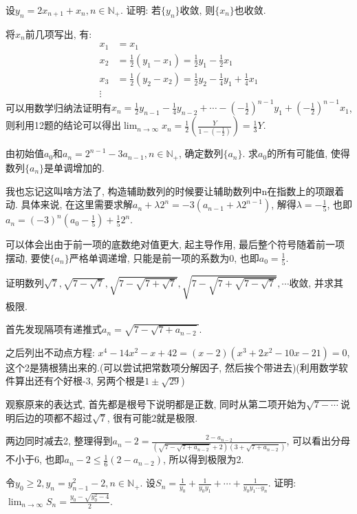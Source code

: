     \begin{exercise}
         设$y_n=2x_{n+1}+x_n, n\in \mathbb{N}_+$. 证明: 若$\{y_n\}$收敛, 则$\{x_n\}$也收敛.
     \end{exercise}
     \begin{solution}
         将$x_n$前几项写出, 有:
         \begin{align*}
             x_1 & =x_1                                                               \\
             x_2 & =\frac{1}{2}(y_1-x_1)=\frac{1}{2}y_1-\frac{1}{2}x_1                \\
             x_3 & =\frac{1}{2}(y_2-x_2)=\frac{1}{2}y_2-\frac{1}{4}y_1+\frac{1}{4}x_1 \\
             \vdots
         \end{align*}
         可以用数学归纳法证明有$x_n=\frac{1}{2}y_{n-1}-\frac{1}{4}y_{n-2}+\cdots-(-\frac{1}{2})^{n-1}y_1+(-\frac{1}{2})^{n-1}x_1$,则利用12题的结论可以得出$\lim_{n\to\infty}x_n=\frac{1}{2}(\frac{Y}{1-(-\frac{1}{2})})=\frac{1}{3}Y$.
     \end{solution}

     \begin{exercise}
         由初始值$a_0$和$a_n=2^{n-1}-3a_{n-1}, n \in \mathbb{N}_+$, 确定数列$\{a_n\}$. 求$a_0$的所有可能值, 使得数列$\{a_n\}$是单调增加的.
     \end{exercise}
     \begin{solution}
         我也忘记这叫啥方法了, 构造辅助数列的时候要让辅助数列中n在指数上的项跟着动. 具体来说, 在这里需要求解$a_n+\lambda 2^n=-3(a_{n-1}+\lambda 2^{n-1})$, 解得$\lambda=-\frac{1}{5}$, 也即$a_n=(-3)^n(a_0-\frac{1}{5})+\frac{1}{5}2^n$.

         可以体会出由于前一项的底数绝对值更大, 起主导作用, 最后整个符号随着前一项摆动, 要使$\{a_n\}$严格单调递增, 只能是前一项的系数为0, 也即$a_0=\frac{1}{5}$.
     \end{solution}

     \begin{exercise}
         证明数列$\sqrt{7}, \sqrt{7-\sqrt{7}}, \sqrt{7-\sqrt{7+\sqrt{7}}}, \sqrt{7-\sqrt{7+\sqrt{7-\sqrt{7}}}}, \cdots$收敛, 并求其极限.
     \end{exercise}
     \begin{solution}
         首先发现隔项有递推式$a_n=\sqrt{7-\sqrt{7+a_{n-2}}}$.

         之后列出不动点方程: $x^4-14x^2-x+42=(x-2)(x^3+2x^2-10x-21)=0$, 这个2是猜根猜出来的.(可以尝试把常数项分解因子, 然后挨个带进去)(利用数学软件算出还有个好根-3, 另两个根是$1\pm \sqrt{29}$)

         观察原来的表达式, 首先都是根号下说明都是正数, 同时从第二项开始为$\sqrt{7-\cdots}$说明后边的项都不超过$\sqrt{7}$, 很有可能2就是极限.

         两边同时减去2, 整理得到$a_n-2=\frac{2-a_{n-2}}{(\sqrt{7-\sqrt{7+a_{n-2}}}+2)(3+\sqrt{7+a_{n-2}})}$, 可以看出分母不小于6, 也即$a_n-2 \leqslant \frac{1}{6}(2-a_{n-2})$, 所以得到极限为2.
     \end{solution}

     \begin{exercise}
         令$y_0 \geqslant 2, y_n=y_{n-1}^2-2, n \in \mathbb{N}_+$. 设$S_n=\frac{1}{y_0}+\frac{1}{y_0y_1}+\cdots+\frac{1}{y_0y_1\cdots y_n}$. 证明: $\lim_{n\to\infty}S_n=\frac{y_0-\sqrt{y_0^2-4}}{2}$.
     \end{exercise}
